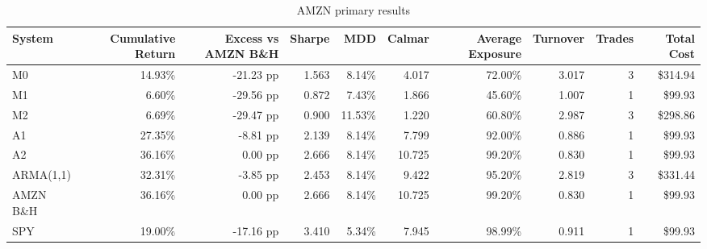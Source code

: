 \begin{table}[htbp]
\centering
\small
\caption{AMZN primary results}
\label{tab:amzn-primary}
\begin{tabular}{lrrrrrrrrr}
\toprule
System & Cumulative Return & Excess vs AMZN B\&H & Sharpe & MDD & Calmar & Average Exposure & Turnover & Trades & Total Cost \\
\midrule
M0 & 14.93\% & -21.23 pp & 1.563 & 8.14\% & 4.017 & 72.00\% & 3.017 & 3 & \$314.94 \\
M1 & 6.60\% & -29.56 pp & 0.872 & 7.43\% & 1.866 & 45.60\% & 1.007 & 1 & \$99.93 \\
M2 & 6.69\% & -29.47 pp & 0.900 & 11.53\% & 1.220 & 60.80\% & 2.987 & 3 & \$298.86 \\
A1 & 27.35\% & -8.81 pp & 2.139 & 8.14\% & 7.799 & 92.00\% & 0.886 & 1 & \$99.93 \\
A2 & 36.16\% & 0.00 pp & 2.666 & 8.14\% & 10.725 & 99.20\% & 0.830 & 1 & \$99.93 \\
ARMA(1,1) & 32.31\% & -3.85 pp & 2.453 & 8.14\% & 9.422 & 95.20\% & 2.819 & 3 & \$331.44 \\
AMZN B\&H & 36.16\% & 0.00 pp & 2.666 & 8.14\% & 10.725 & 99.20\% & 0.830 & 1 & \$99.93 \\
SPY & 19.00\% & -17.16 pp & 3.410 & 5.34\% & 7.945 & 98.99\% & 0.911 & 1 & \$99.93 \\
\bottomrule
\end{tabular}
\end{table}
